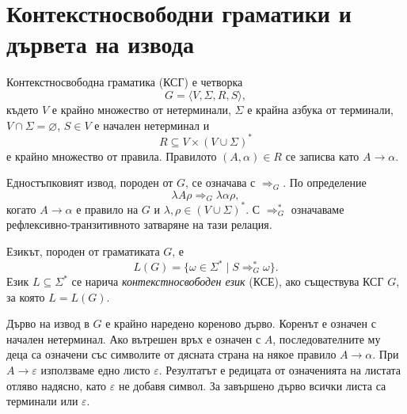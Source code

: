 \begin{konspekt}
\end{konspekt}

\section{Контекстносвободни граматики и дървета на извода}\label{s:5.1}

\begin{defn}
Контекстносвободна граматика (КСГ) е четворка
\[
G=\langle V,\Sigma,R,S\rangle,
\]
където $V$ е крайно множество от нетерминали, $\Sigma$ е крайна азбука от терминали, $V\cap\Sigma=\varnothing$, $S\in V$ е начален нетерминал и
\[
R\subseteq V\times(V\cup\Sigma)^*
\]
е крайно множество от правила. Правилото $(A,\alpha)\in R$ се записва като $A\to\alpha$.
\end{defn}

\begin{defn}
Едностъпковият извод, породен от $G$, се означава с $\Rightarrow_G$. По определение
\[
\lambda A\rho\Rightarrow_G\lambda\alpha\rho,
\]
когато $A\to\alpha$ е правило на $G$ и $\lambda,\rho\in(V\cup\Sigma)^*$.
С $\Rightarrow_G^*$ означаваме рефлексивно-транзитивното затваряне на тази релация.
\end{defn}

\begin{defn}
Езикът, породен от граматиката $G$, е
\[
L(G)=\{\omega\in\Sigma^*\mid S\Rightarrow_G^*\omega\}.
\]
Език $L\subseteq\Sigma^*$ се нарича \emph{контекстносвободен език} (КСЕ), ако съществува КСГ $G$, за която $L=L(G)$.
\end{defn}

\begin{defn}
Дърво на извод в $G$ е крайно наредено кореново дърво. Коренът е означен с начален нетерминал. Ако вътрешен връх е означен с $A$, последователните му деца са означени със символите от дясната страна на някое правило $A\to\alpha$. При $A\to\varepsilon$ използваме едно листо $\varepsilon$. Резултатът е редицата от означенията на листата отляво надясно, като $\varepsilon$ не добавя символ. За завършено дърво всички листа са терминали или $\varepsilon$.
\end{defn}

